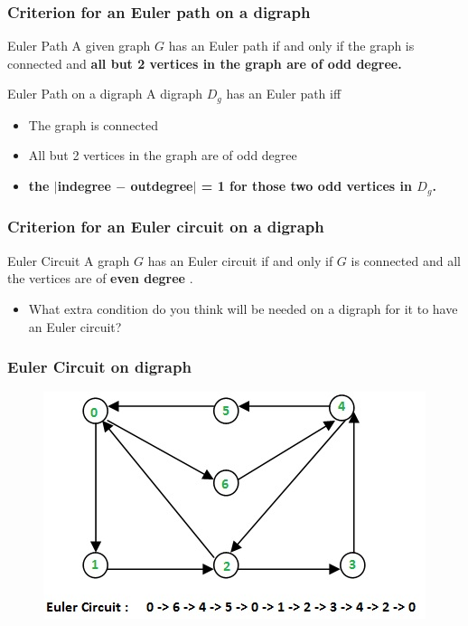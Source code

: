 \documentclass{beamer}
\begin{document}

\begin{frame}
\frametitle{Criterion for an Euler path on a digraph}
\begin{block}{Euler Path}
A given graph $G$ has an Euler path if and only if the graph is connected and \textbf{all but 2 vertices in the graph are of odd degree.}
\end{block}

\begin{block}{Euler Path on a digraph}
A digraph $D_g$ has an Euler path iff
\begin{itemize}

\item The graph is connected 
\item All but 2 vertices in the graph are of odd degree
\item \textbf{the \textbf{$|$indegree $-$ outdegree$|$ = 1} for those two odd vertices in $D_g$.}

\end{itemize}
\end{block}
\end{frame}


\begin{frame}
\frametitle{Criterion for an Euler circuit on a digraph}
\begin{block}{Euler Circuit}
A graph $G$ has an Euler circuit if and only if $G$ is connected and all the vertices are of \textbf{even degree} . 
\end{block}
\pause
\begin{itemize}
\item What extra condition do you think will be needed on a digraph for it to have an Euler circuit?
\end{itemize}
\end{frame}


\begin{frame}
\frametitle{Euler Circuit on digraph}
\begin{figure}[h]
\includegraphics[scale = 0.8]{eulerdi.jpg}
\end{figure}
\end{frame}
\end{document}

